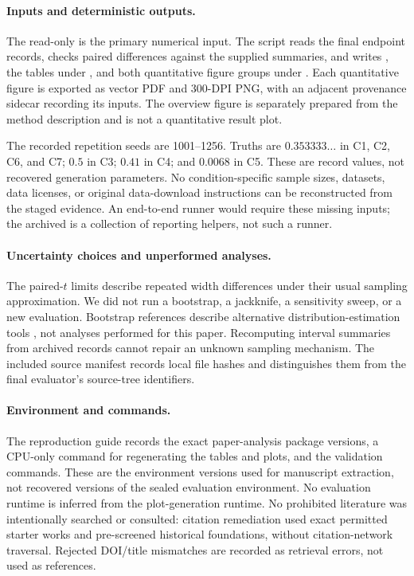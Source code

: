 \documentclass{article}
\begin{document}
\paragraph{Inputs and deterministic outputs.}
The read-only  is the primary numerical input. The script  reads the final endpoint records, checks paired differences against the supplied summaries, and writes , the tables under , and both quantitative figure groups under . Each quantitative figure is exported as vector PDF and 300-DPI PNG, with an adjacent provenance sidecar recording its inputs. The overview figure is separately prepared from the method description and is not a quantitative result plot.

The recorded repetition seeds are 1001--1256. Truths are $0.353333\ldots$ in C1, C2, C6, and C7; $0.5$ in C3; $0.41$ in C4; and $0.0068$ in C5. These are record values, not recovered generation parameters. No condition-specific sample sizes, datasets, data licenses, or original data-download instructions can be reconstructed from the staged evidence. An end-to-end runner would require these missing inputs; the archived  is a collection of reporting helpers, not such a runner.

\paragraph{Uncertainty choices and unperformed analyses.}
The paired-$t$ limits describe repeated width differences under their usual sampling approximation. We did not run a bootstrap, a jackknife, a sensitivity sweep, or a new evaluation. Bootstrap references describe alternative distribution-estimation tools \citep{Efron1979,EfronTibshirani1993}, not analyses performed for this paper. Recomputing interval summaries from archived records cannot repair an unknown sampling mechanism. The included source manifest records local file hashes and distinguishes them from the final evaluator's source-tree identifiers.

\paragraph{Environment and commands.}
The reproduction guide records the exact paper-analysis package versions, a CPU-only command for regenerating the tables and plots, and the validation commands. These are the environment versions used for manuscript extraction, not recovered versions of the sealed evaluation environment. No evaluation runtime is inferred from the plot-generation runtime. No prohibited literature was intentionally searched or consulted: citation remediation used exact permitted starter works and pre-screened historical foundations, without citation-network traversal. Rejected DOI/title mismatches are recorded as retrieval errors, not used as references.
\end{document}
